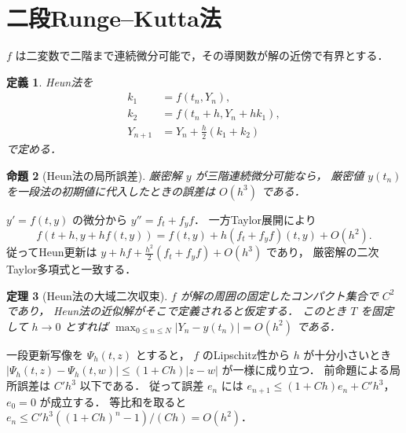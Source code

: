 \documentclass[a5paper,10pt,onecolumn]{jsarticle}
\makeatletter
\theoremstyle{mathnotetheorem}
\newtheorem{theorem}{定理}[section]
\newtheorem{definition}[theorem]{定義}
\newtheorem{proposition}[theorem]{命題}
\renewcommand{\proofname}{証明}
\renewenvironment{proof}[1][\proofname]{%
  \par\pushQED{\qed}\normalfont\topsep4\p@\@plus2\p@\relax
  \trivlist\item[\hskip\labelsep\bfseries #1]\ignorespaces
}{\popQED\endtrivlist\@endpefalse}
\makeatother
\begin{document}
\section{二段Runge--Kutta法}
$f$ は二変数で二階まで連続微分可能で，その導関数が解の近傍で有界とする．
\begin{definition}
Heun法を
\[
 \begin{aligned}
 k_1&=f(t_n,Y_n),\\
 k_2&=f(t_n+h,Y_n+hk_1),\\
 Y_{n+1}&=Y_n+\frac h2(k_1+k_2)
 \end{aligned}
\]
で定める．
\end{definition}
\begin{proposition}[Heun法の局所誤差]
厳密解 $y$ が三階連続微分可能なら，
厳密値 $y(t_n)$ を一段法の初期値に代入したときの誤差は $O(h^3)$ である．
\end{proposition}
\begin{proof}
$y'=f(t,y)$ の微分から $y''=f_t+f_y f$．
一方Taylor展開により
\[
 f(t+h,y+h f(t,y))
 =f(t,y)+h(f_t+f_yf)(t,y)+O(h^2).
\]
従ってHeun更新は
$y+h f+\frac{h^2}{2}(f_t+f_yf)+O(h^3)$ であり，
厳密解の二次Taylor多項式と一致する．
\end{proof}
\begin{theorem}[Heun法の大域二次収束]
$f$ が解の周囲の固定したコンパクト集合で $C^2$ であり，
Heun法の近似解がそこで定義されると仮定する．
このとき $T$ を固定して $h\to0$ とすれば
$\max_{0\le n\le N}|Y_n-y(t_n)|=O(h^2)$ である．
\end{theorem}
\begin{proof}
一段更新写像を $\Psi_h(t,z)$ とすると，
$f$ のLipschitz性から $h$ が十分小さいとき
$|\Psi_h(t,z)-\Psi_h(t,w)|\le(1+Ch)|z-w|$ が一様に成り立つ．
前命題による局所誤差は $C'h^3$ 以下である．
従って誤差 $e_n$ には
$e_{n+1}\le(1+Ch)e_n+C'h^3$，$e_0=0$ が成立する．
等比和を取ると $e_n\le C'h^3((1+Ch)^n-1)/(Ch)=O(h^2)$．
\end{proof}
\end{document}
